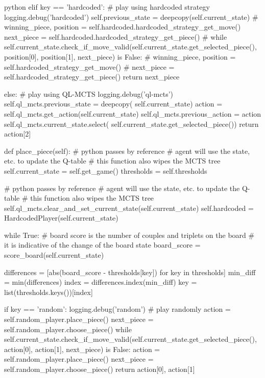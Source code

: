 \begin{mintedbox}{python}
        elif key == 'hardcoded':
            # play using hardcoded strategy
            logging.debug('hardcoded')
            self.previous_state = deepcopy(self.current_state)
            # winning_piece, position = self.hardcoded.hardcoded_strategy_get_move()
            next_piece = self.hardcoded.hardcoded_strategy_get_piece()
            # while self.current_state.check_if_move_valid(self.current_state.get_selected_piece(), position[0], position[1], next_piece) is False:
            #     winning_piece, position = self.hardcoded_strategy_get_move()
            #     next_piece = self.hardcoded_strategy_get_piece()
            return next_piece

        else:
            # play using QL-MCTS
            logging.debug('ql-mcts')
            self.ql_mcts.previous_state = deepcopy(
                self.current_state)
            action = self.ql_mcts.get_action(self.current_state)
            self.ql_mcts.previous_action = action
            self.ql_mcts.current_state.select(
                self.current_state.get_selected_piece())
            return action[2]

    def place_piece(self):
        # python passes by reference
        # agent will use the state, etc. to update the Q-table
        # this function also wipes the MCTS tree
        self.current_state = self.get_game()
        thresholds = self.thresholds

        # python passes by reference
        # agent will use the state, etc. to update the Q-table
        # this function also wipes the MCTS tree
        self.ql_mcts.clear_and_set_current_state(self.current_state)
        self.hardcoded = HardcodedPlayer(self.current_state)

        while True:
            # board score is the number of couples and triplets on the board
            # it is indicative of the change of the board state
            board_score = score_board(self.current_state)

            differences = [abs(board_score - thresholds[key])
                            for key in thresholds]
            min_diff = min(differences)
            index = differences.index(min_diff)
            key = list(thresholds.keys())[index]

            if key == 'random':
                logging.debug('random')
                # play randomly
                action = self.random_player.place_piece()
                next_piece = self.random_player.choose_piece()
                while self.current_state.check_if_move_valid(self.current_state.get_selected_piece(), action[0], action[1], next_piece) is False:
                    action = self.random_player.place_piece()
                    next_piece = self.random_player.choose_piece()
                return action[0], action[1]


\end{mintedbox}
